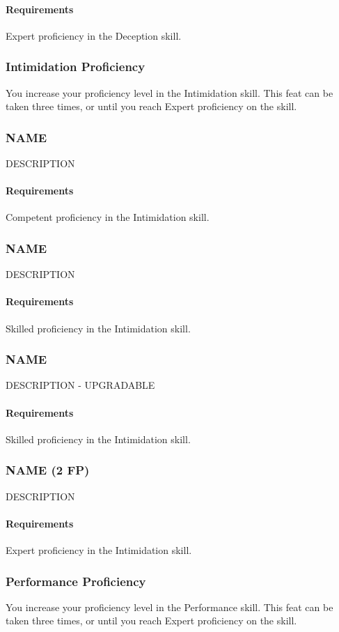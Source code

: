     \paragraph{Requirements} Expert proficiency in the Deception skill.
\subsubsection{Intimidation Proficiency} \label{feat::intimidationprof}
    You increase your proficiency level in the Intimidation skill.
    This feat can be taken three times, or until you reach Expert proficiency on the skill.
\subsubsection{NAME} \label{feat::name}
    DESCRIPTION
    \paragraph{Requirements} Competent proficiency in the Intimidation skill.
\subsubsection{NAME} \label{feat::name}
    DESCRIPTION
    \paragraph{Requirements} Skilled proficiency in the Intimidation skill.
\subsubsection{NAME} \label{feat::name}
    DESCRIPTION - UPGRADABLE
    \paragraph{Requirements} Skilled proficiency in the Intimidation skill.
\subsubsection{NAME (2 FP)} \label{feat::name}
    DESCRIPTION
    \paragraph{Requirements} Expert proficiency in the Intimidation skill.
\subsubsection{Performance Proficiency} \label{feat::performanceprof}
    You increase your proficiency level in the Performance skill.
    This feat can be taken three times, or until you reach Expert proficiency on the skill.
